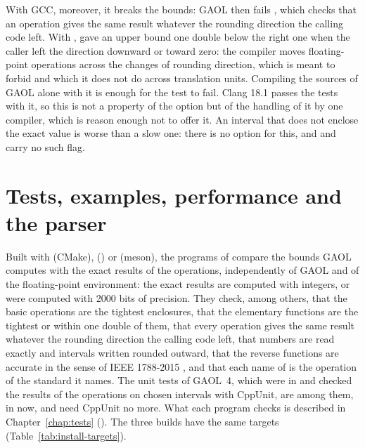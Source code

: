 \documentclass[12pt,a4paper,twoside,openright]{book}
\begin{document}
\medskip
With GCC, moreover, it breaks the bounds: GAOL then fails
, which checks that an operation gives
the same result whatever the rounding direction the calling code left. With
,
 gave an upper bound one double below
the right one when the caller left the direction downward or toward zero: the
compiler moves floating-point operations across the changes of rounding
direction, which  is meant to forbid and which it
does not do across translation units. Compiling the sources of GAOL alone
with it is enough for the test to fail. Clang 18.1 passes the tests with it,
so this is not a property of the option but of the handling of it by one
compiler, which is reason enough not to offer it. An interval that does not
enclose the exact value is worse than a slow one: there is no option for
this, and  and  carry no such flag.

\section{Tests, examples, performance and the parser}\label{sec:tests}
%

Built with  (CMake), 
() or  (meson), the programs of 
compare the bounds GAOL computes with the exact results of the operations,
independently of GAOL and of the floating-point environment: the exact
results are computed with integers, or were computed with 2000 bits of
precision. They check, among others, that the basic operations are the
tightest enclosures, that the elementary functions are the tightest or within
one double of them, that every operation gives the same result whatever the
rounding direction the calling code left, that numbers are read exactly and
intervals written rounded outward, that the reverse functions are accurate in
the sense of IEEE 1788-2015 \cite{IEEE1788:2015}, and that each name of
 is the operation of the standard it names. The unit
tests of GAOL~4, which were in  and checked the results of the
operations on chosen intervals with CppUnit, are among them, in 
now, and need CppUnit no more.\newinvfive{} What each program checks is
described in Chapter~\ref{chap:tests} (). The three
builds have the same targets (Table~\ref{tab:install-targets}).
\end{document}

